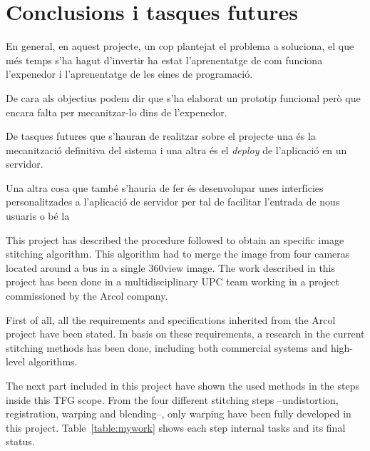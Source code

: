 \chapter{Conclusions i tasques futures}

En general, en aquest projecte, un cop plantejat el problema a soluciona, el que més temps s'ha hagut d'invertir ha estat l'aprenentatge de com funciona l'expenedor i l'aprenentatge de les eines de programació.

De cara als objectius podem dir que s'ha elaborat un prototip funcional però que encara falta per mecanitzar-lo dins de l'expenedor.

De tasques futures que s'hauran de realitzar sobre el projecte una és la mecanització definitiva del sistema i una altra és el \textit{deploy} de l'aplicació en un servidor.

Una altra cosa que també s'hauria de fer és desenvolupar unes interfícies personalitzades a l'aplicació de servidor per tal de facilitar l'entrada de nous usuaris o bé la 

This project has described the procedure followed to obtain an specific image stitching algorithm. This algorithm had to merge the image from four cameras located around a bus in a single 360\degree view image. The work described in this project has been done in a multidisciplinary UPC team working in a project commissioned by the Arcol company.

First of all, all the requirements and specifications inherited from the Arcol project have been stated. In basis on these requirements, a research in the current stitching methods has been done, including both commercial systems and high-level algorithms.

The next part included in this project have shown the used methods in the steps inside this TFG scope. From the four different stitching steps --undistortion, registration, warping and blending--, only warping have been fully developed in this project. Table~\ref{table:mywork} shows each step internal tasks and its final status.

